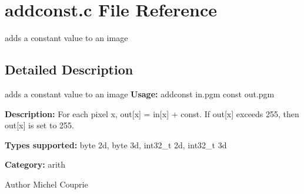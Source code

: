 \section{addconst.c File Reference}
\label{addconst_8c}


adds a constant value to an image  




\subsection{Detailed Description}
adds a constant value to an image {\bfseries Usage:} addconst in.pgm const out.pgm

{\bfseries Description:} For each pixel x, out[x] = in[x] + const. If out[x] exceeds 255, then out[x] is set to 255.

{\bfseries Types supported:} byte 2d, byte 3d, int32\_\-t 2d, int32\_\-t 3d

{\bfseries Category:} arith

\begin{DoxyAuthor}{Author}
Michel Couprie 
\end{DoxyAuthor}
